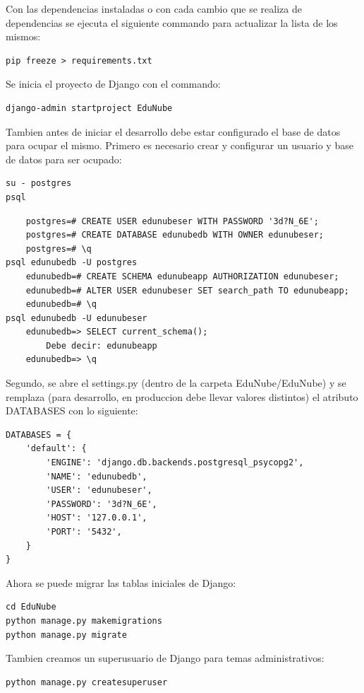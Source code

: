 Con las dependencias instaladas o con cada cambio que se realiza de dependencias se ejecuta el siguiente commando para actualizar la lista de los mismos:

\begin{lstlisting}
pip freeze > requirements.txt
\end{lstlisting}

Se inicia el proyecto de Django con el commando:

\begin{lstlisting}
django-admin startproject EduNube
\end{lstlisting}

Tambien antes de iniciar el desarrollo debe estar configurado el base de datos para ocupar el mismo. Primero es necesario crear y configurar un usuario y base de datos para ser ocupado:

\begin{lstlisting}
su - postgres
psql
\end{lstlisting}
\begin{lstlisting}
	postgres=# CREATE USER edunubeser WITH PASSWORD '3d?N_6E';
	postgres=# CREATE DATABASE edunubedb WITH OWNER edunubeser;
	postgres=# \q
psql edunubedb -U postgres
	edunubedb=# CREATE SCHEMA edunubeapp AUTHORIZATION edunubeser;
	edunubedb=# ALTER USER edunubeser SET search_path TO edunubeapp;
	edunubedb=# \q
psql edunubedb -U edunubeser
	edunubedb=> SELECT current_schema();
		Debe decir: edunubeapp
	edunubedb=> \q
\end{lstlisting}

Segundo, se abre el settings.py (dentro de la carpeta EduNube/EduNube) y se remplaza (para desarrollo, en produccion debe llevar valores distintos) el atributo DATABASES con lo siguiente:
\lstset{language=Python}
\begin{lstlisting}
DATABASES = {
    'default': {
        'ENGINE': 'django.db.backends.postgresql_psycopg2',
        'NAME': 'edunubedb',
        'USER': 'edunubeser',
        'PASSWORD': '3d?N_6E',
        'HOST': '127.0.0.1',
        'PORT': '5432',
    }
}
\end{lstlisting}
\lstset{language=Bash}

Ahora se puede migrar las tablas iniciales de Django:
\begin{lstlisting}
cd EduNube
python manage.py makemigrations
python manage.py migrate
\end{lstlisting}

Tambien creamos un superusuario de Django para temas administrativos:
\begin{lstlisting}
python manage.py createsuperuser
\end{lstlisting}

